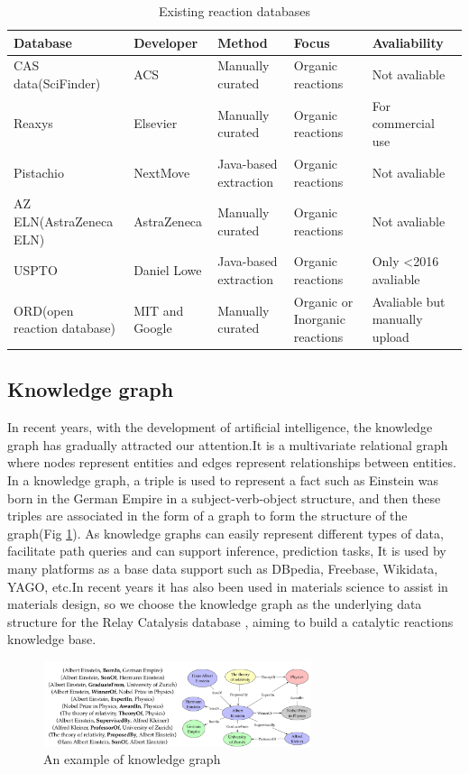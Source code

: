 \documentclass[%
 aip,
 jmp,%
 amsmath,amssymb,
 reprint,%
]{revtex4-2}
\begin{document}
\begin{table}[h!]
\begin{tabular}{ |p{3cm}|p{3cm}|p{3cm}|p{3cm}|p{3cm}|  }
\hline
Database&Developer&Method&Focus&Avaliability\\ \hline
CAS data(SciFinder)& ACS    &Manually curated&   Organic reactions&Not avaliable\\ \hline
Reaxys&   Elsevier  & Manually curated   &Organic reactions&For commercial use\\ \hline
Pistachio & NextMove & Java-based extraction &  Organic reactions&Not avaliable\\ \hline
AZ ELN(AstraZeneca ELN)    &AstraZeneca & Manually curated&  Organic reactions&Not avaliable\\ \hline
USPTO&   Daniel Lowe  & Java-based extraction&Organic reactions&Only <2016 avaliable\\ \hline
ORD(open reaction database) & MIT and Google  & Manually curated   &Organic or Inorganic reactions&Avaliable but manually upload\\ \hline
\end{tabular}
\caption{Existing reaction databases}
\label{table.1}
\end{table}

\subsection{Knowledge graph}

In recent years, with the development of artificial intelligence, the knowledge graph has gradually 
attracted our attention.It is a multivariate relational graph where nodes represent entities and 
edges represent relationships between entities. In a knowledge graph, a triple is used to represent a 
fact such as Einstein was born in the German Empire in a subject-verb-object structure, and then 
these triples are associated in the form of a graph to form the structure of the graph(Fig \ref{ Fig.2 }).
As knowledge graphs can easily represent different types of data, facilitate path queries and can support inference, 
prediction tasks, It is used by many platforms as a base data support such as DBpedia, Freebase, Wikidata,
YAGO, etc.In recent years it has also been used in materials science to assist in materials design, 
so we choose the knowledge graph as the underlying data structure for the Relay Catalysis database 
, aiming to build a catalytic reactions knowledge base.

\begin{figure}[htbp]
 \centering
 \includegraphics[width=0.7\textwidth]{figure/2.png}
 \caption{ An example of knowledge graph }
 \label{ Fig.2 }
\end{figure}
\end{document}
